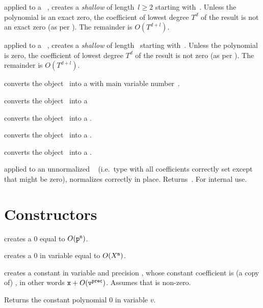  applied to a ~, creates
a \emph{shallow}  of length~$l\geq 2$ starting with~.
Unless the polynomial is an exact zero, the coefficient of lowest degree
$T^d$ of the result is not an exact zero (as per ). The
remainder is $O(T^{d+l})$.

 applied to a ~,
creates a \emph{shallow}  of length~ starting with~.
Unless the polynomial is zero, the coefficient of lowest degree
$T^d$ of the result is not zero (as per ). The
remainder is $O(T^{d+l})$.

 converts the object~ into a 
with main variable number~.

 converts the object~ into a 

 converts the object~ into a .

 converts the object~ into a .

 converts the object~ into a
.

 applied to an unnormalized ~
(i.e.~type  with all coefficients correctly set except that 
might be zero), normalizes  correctly in place. Returns~.
For internal use.

\section{Constructors}

\label{se:clean}

 creates a $0$  equal to
$O({\tt p}^{\tt n})$.

 creates a $0$  in variable
 equal to $O(X^{\tt n})$.

 creates a constant 
in variable  and precision , whose constant coefficient is
(a copy of) , in other words ${\tt x} + O({\tt v}^{\tt prec})$.
Assumes that  is non-zero.

 Returns the constant polynomial $0$ in variable $v$.

